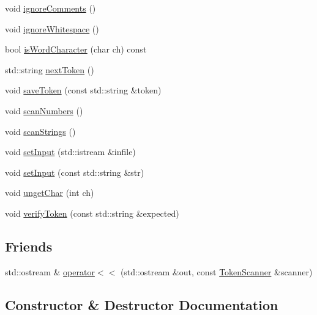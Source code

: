 \begin{DoxyCompactItemize}
void \mbox{\hyperlink{classTokenScanner_a2948758a40dec8f13f9de47352afcc9f}{ignore\+Comments}} ()
\item 
void \mbox{\hyperlink{classTokenScanner_a1dd9d28ae227b7e0313be6dd0ecca373}{ignore\+Whitespace}} ()
\item 
bool \mbox{\hyperlink{classTokenScanner_ad3446183cc2011a6bb3ebe1ce1c3391a}{is\+Word\+Character}} (char ch) const
\item 
std\+::string \mbox{\hyperlink{classTokenScanner_ad515fb115cc77b70c2a498049ba16256}{next\+Token}} ()
\item 
void \mbox{\hyperlink{classTokenScanner_a6ca063c69febcb61e6b49a210563194f}{save\+Token}} (const std\+::string \&token)
\item 
void \mbox{\hyperlink{classTokenScanner_a0bebe5cb8dd72954dc34cf5338db03dc}{scan\+Numbers}} ()
\item 
void \mbox{\hyperlink{classTokenScanner_af85e801b4ef298db6ddbfd539a8f45db}{scan\+Strings}} ()
\item 
void \mbox{\hyperlink{classTokenScanner_adb06e967f852573750bd97c5a76c790c}{set\+Input}} (std\+::istream \&infile)
\item 
void \mbox{\hyperlink{classTokenScanner_a3c337c514c15a062c8e3dd04e0e9a824}{set\+Input}} (const std\+::string \&str)
\item 
void \mbox{\hyperlink{classTokenScanner_a44b49340cfed6b94e9f625c9f2f73fbf}{unget\+Char}} (int ch)
\item 
void \mbox{\hyperlink{classTokenScanner_ad7ae526d42faff3aca1c860f302cbb76}{verify\+Token}} (const std\+::string \&expected)
\end{DoxyCompactItemize}
\subsection*{Friends}
\begin{DoxyCompactItemize}
\item 
std\+::ostream \& \mbox{\hyperlink{classTokenScanner_a23b7e3f2cb864430084bde0951947124}{operator$<$$<$}} (std\+::ostream \&out, const \mbox{\hyperlink{classTokenScanner}{Token\+Scanner}} \&scanner)
\end{DoxyCompactItemize}


\subsection{Constructor \& Destructor Documentation}
\mbox{\label{classTokenScanner_a284595cf3c3df7d3e70ef2dcdc1f0292}} 

